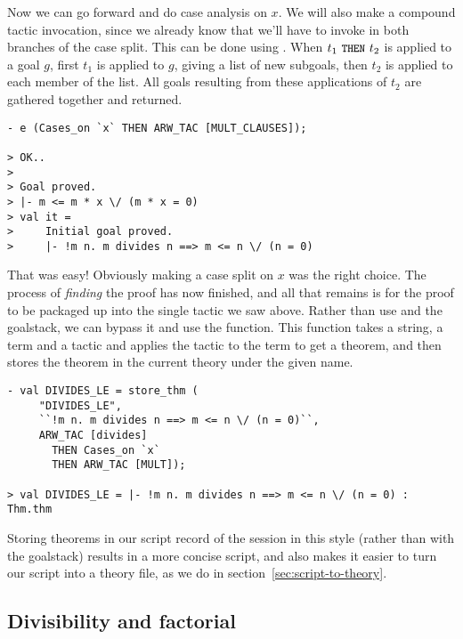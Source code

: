 Now we can go forward and do case analysis on $x$. We will
    also make a compound tactic invocation, since we already know that
    we'll have to invoke  in both branches of the case
    split. This can be done using .  When $t_1 \
    \mbox{\ml{THEN}}\ t_2$ is applied to a goal $g$, first $t_1$ is
    applied to $g$, giving a list of new subgoals, then $t_2$ is
    applied to each member of the list. All goals resulting from these
    applications of $t_2$ are gathered together and returned.
\begin{session}\begin{verbatim}
- e (Cases_on `x` THEN ARW_TAC [MULT_CLAUSES]);

> OK..
>
> Goal proved.
> |- m <= m * x \/ (m * x = 0)
> val it =
>     Initial goal proved.
>     |- !m n. m divides n ==> m <= n \/ (n = 0)
\end{verbatim}\end{session}
    That was easy! Obviously making a case split on $x$ was the right
    choice. The process of {\it finding\/} the proof has now finished,
    and all that remains is for the proof to be packaged up into the
    single tactic we saw above.  Rather than use \ml{top\_thm} and the
    goalstack, we can bypass it and use the \ml{store\_thm} function.
    This function takes a string, a term and a tactic and applies the
    tactic to the term to get a theorem, and then stores the theorem
    in the current theory under the given name.
\begin{session}\begin{verbatim}
- val DIVIDES_LE = store_thm (
     "DIVIDES_LE",
     ``!m n. m divides n ==> m <= n \/ (n = 0)``,
     ARW_TAC [divides]
       THEN Cases_on `x`
       THEN ARW_TAC [MULT]);

> val DIVIDES_LE = |- !m n. m divides n ==> m <= n \/ (n = 0) : Thm.thm
\end{verbatim}\end{session}
    Storing theorems in our script record of the session in this style
    (rather than with the goalstack) results in a more concise script,
    and also makes it easier to turn our script into a theory file, as
    we do in section~\ref{sec:script-to-theory}.

\subsection{Divisibility and factorial}

